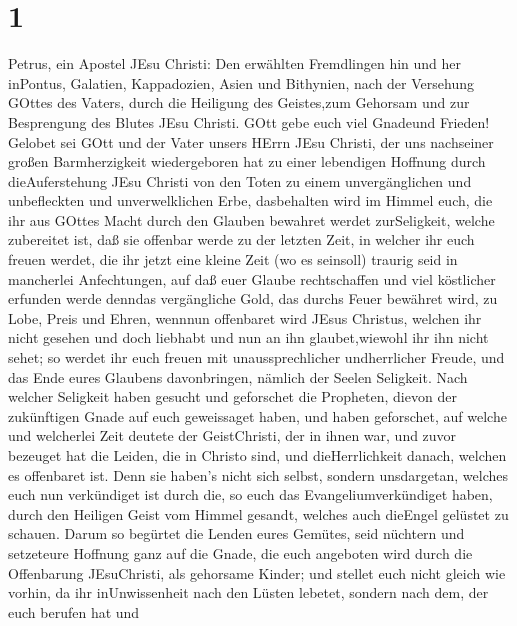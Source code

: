 \hypertarget{section}{%
\section{1}\label{section}}

 Petrus, ein Apostel JEsu Christi: Den erwählten Fremdlingen
hin und her inPontus, Galatien, Kappadozien, Asien und Bithynien,
 nach der Versehung GOttes des Vaters, durch die Heiligung
des Geistes,zum Gehorsam und zur Besprengung des Blutes JEsu Christi.
GOtt gebe euch viel Gnadeund Frieden!  Gelobet sei GOtt und
der Vater unsers HErrn JEsu Christi, der uns nachseiner großen
Barmherzigkeit wiedergeboren hat zu einer lebendigen Hoffnung durch
dieAuferstehung JEsu Christi von den Toten  zu einem
unvergänglichen und unbefleckten und unverwelklichen Erbe, dasbehalten
wird im Himmel  euch, die ihr aus GOttes Macht durch den
Glauben bewahret werdet zurSeligkeit, welche zubereitet ist, daß sie
offenbar werde zu der letzten Zeit,  in welcher ihr euch
freuen werdet, die ihr jetzt eine kleine Zeit (wo es seinsoll) traurig
seid in mancherlei Anfechtungen,  auf daß euer Glaube
rechtschaffen und viel köstlicher erfunden werde denndas vergängliche
Gold, das durchs Feuer bewähret wird, zu Lobe, Preis und Ehren, wennnun
offenbaret wird JEsus Christus,  welchen ihr nicht gesehen
und doch liebhabt und nun an ihn glaubet,wiewohl ihr ihn nicht sehet; so
werdet ihr euch freuen mit unaussprechlicher undherrlicher Freude,
 und das Ende eures Glaubens davonbringen, nämlich der
Seelen Seligkeit.  Nach welcher Seligkeit haben gesucht und
geforschet die Propheten, dievon der zukünftigen Gnade auf euch
geweissaget haben,  und haben geforschet, auf welche und
welcherlei Zeit deutete der GeistChristi, der in ihnen war, und zuvor
bezeuget hat die Leiden, die in Christo sind, und dieHerrlichkeit
danach,  welchen es offenbaret ist. Denn sie haben's nicht
sich selbst, sondern unsdargetan, welches euch nun verkündiget ist durch
die, so euch das Evangeliumverkündiget haben, durch den Heiligen Geist
vom Himmel gesandt, welches auch dieEngel gelüstet zu schauen.
 Darum so begürtet die Lenden eures Gemütes, seid nüchtern
und setzeteure Hoffnung ganz auf die Gnade, die euch angeboten wird
durch die Offenbarung JEsuChristi,  als gehorsame Kinder;
und stellet euch nicht gleich wie vorhin, da ihr inUnwissenheit nach den
Lüsten lebetet,  sondern nach dem, der euch berufen hat und
